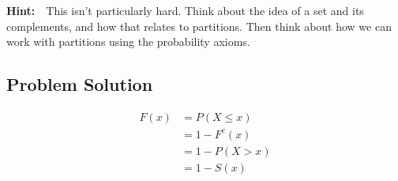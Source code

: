 \documentclass[12pt]{article}
\theoremstyle{definition}
\begin{document}
\bigskip
\noindent
{\bf Hint:}\ \ This isn't particularly hard. Think about the idea of a set and its complements, and how that relates to partitions. Then think about how we can work with partitions using the probability axioms.



\subsection*{Problem Solution}
\begin{align*}
F(x) &= P(X \leq x)\\
&= 1 - F^c(x) \\
&= 1 - P(X > x)\\
&= 1 - S(x)\\
\end{align*}
\end{document}
